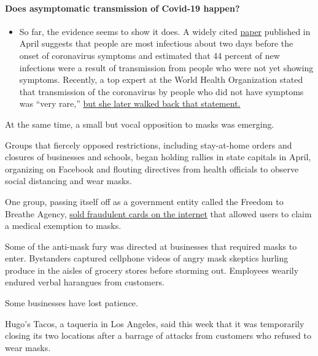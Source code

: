 \begin{itemize}
{  \paragraph{Does asymptomatic transmission of Covid-19
  happen?}\label{does-asymptomatic-transmission-of-covid-19-happen}}

  \begin{itemize}
  \tightlist
  \item
    So far, the evidence seems to show it does. A widely cited
    \href{https://www.nature.com/articles/s41591-020-0869-5}{paper}
    published in April suggests that people are most infectious about
    two days before the onset of coronavirus symptoms and estimated that
    44 percent of new infections were a result of transmission from
    people who were not yet showing symptoms. Recently, a top expert at
    the World Health Organization stated that transmission of the
    coronavirus by people who did not have symptoms was ``very rare,''
    \href{https://www.nytimes.com/2020/06/09/world/coronavirus-updates.html?action=click\&pgtype=Article\&state=default\&region=MAIN_CONTENT_3\&context=storylines_faq\#link-1f302e21}{but
    she later walked back that statement.}
  \end{itemize}
\end{itemize}

At the same time, a small but vocal opposition to masks was emerging.

Groups that fiercely opposed restrictions, including stay-at-home orders
and closures of businesses and schools, began holding rallies in state
capitals in April, organizing on Facebook and flouting directives from
health officials to observe social distancing and wear masks.

One group, passing itself off as a government entity called the Freedom
to Breathe Agency,
\href{https://www.nytimes.com/2020/06/28/us/fake-face-mask-exemption-card-coronavirus.html}{sold
fraudulent cards on the internet} that allowed users to claim a medical
exemption to masks.

Some of the anti-mask fury was directed at businesses that required
masks to enter. Bystanders captured cellphone videos of angry mask
skeptics hurling produce in the aisles of grocery stores before storming
out. Employees wearily endured verbal harangues from customers.

Some businesses have lost patience.

Hugo's Tacos, a taqueria in Los Angeles, said this week that it was
temporarily closing its two locations after a barrage of attacks from
customers who refused to wear masks.

